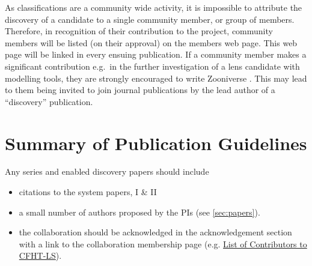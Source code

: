 \documentclass[a4paper,twocolumn]{article}
\begin{document}
As \SW classifications are a community wide activity, it is impossible to attribute the discovery of a candidate to a single community member, or group  of members. Therefore, in recognition of their contribution to the \SW project, \SW community members will be listed (on their approval) on the \SW members web page. This web page will be linked in every ensuing \SW publication. If a community member makes a significant contribution e.g.\ in the further investigation of a lens candidate with modelling tools, they are strongly encouraged to write Zooniverse \Letters. This may lead to them being invited to join journal publications by the lead author of a ``discovery'' publication. 




\section{Summary of Publication Guidelines}
\label{sec:publ}
Any \SW series and \SW enabled discovery papers should include
\begin{itemize}
\item citations to the \SW system papers, \SW I \& II
\item a small number of \SW authors proposed by the \SW PIs (see \ref{sec:papers}).
\item the collaboration should be acknowledged in the acknowledgement section with a link to the collaboration membership page (e.g. \href{https://spacewarps.org/#/projects/CFHTLS/contributors}{List of Contributors to CFHT-LS}).
\end{itemize}


\end{document}
